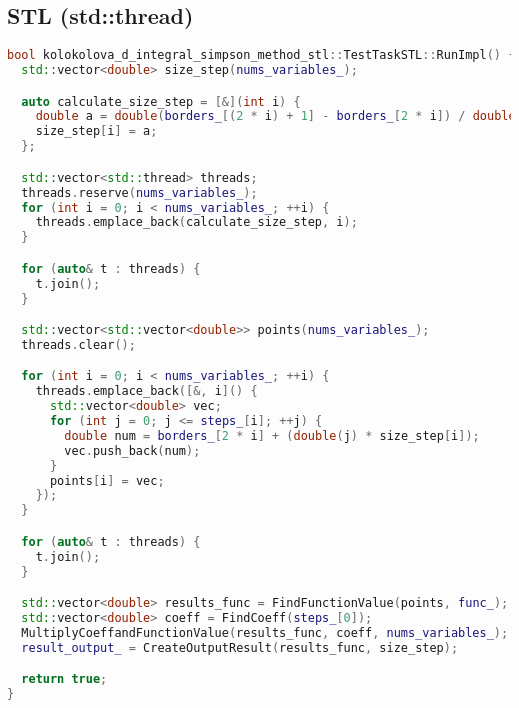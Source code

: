 \documentclass[12pt]{article}
\begin{document}
\subsection*{STL (std::thread)}
\begin{lstlisting}[language=C++]
bool kolokolova_d_integral_simpson_method_stl::TestTaskSTL::RunImpl() {
  std::vector<double> size_step(nums_variables_);

  auto calculate_size_step = [&](int i) {
    double a = double(borders_[(2 * i) + 1] - borders_[2 * i]) / double(steps_[i]);
    size_step[i] = a;
  };

  std::vector<std::thread> threads;
  threads.reserve(nums_variables_);
  for (int i = 0; i < nums_variables_; ++i) {
    threads.emplace_back(calculate_size_step, i);
  }

  for (auto& t : threads) {
    t.join();
  }

  std::vector<std::vector<double>> points(nums_variables_);
  threads.clear();

  for (int i = 0; i < nums_variables_; ++i) {
    threads.emplace_back([&, i]() {
      std::vector<double> vec;
      for (int j = 0; j <= steps_[i]; ++j) {
        double num = borders_[2 * i] + (double(j) * size_step[i]);
        vec.push_back(num);
      }
      points[i] = vec;
    });
  }

  for (auto& t : threads) {
    t.join();
  }

  std::vector<double> results_func = FindFunctionValue(points, func_);
  std::vector<double> coeff = FindCoeff(steps_[0]);
  MultiplyCoeffandFunctionValue(results_func, coeff, nums_variables_);
  result_output_ = CreateOutputResult(results_func, size_step);

  return true;
}
\end{lstlisting}
\newpage
\end{document}
